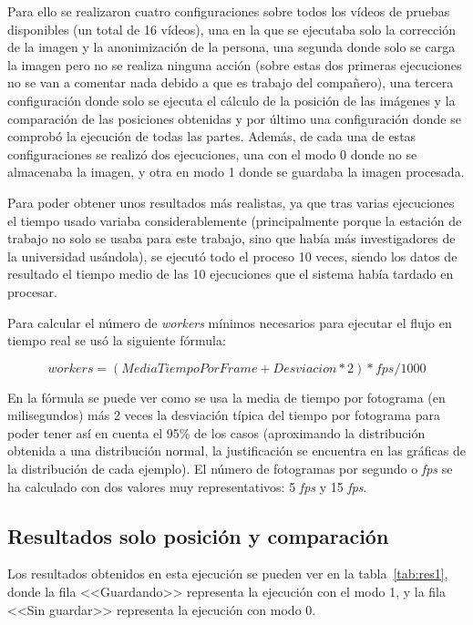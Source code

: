 {Para ello se realizaron cuatro configuraciones sobre todos los vídeos de pruebas disponibles (un total de 16 vídeos), una en la que se ejecutaba solo la corrección de la imagen y la anonimización de la persona, una segunda donde solo se carga la imagen pero no se realiza ninguna acción (sobre estas dos primeras ejecuciones no se van a comentar nada debido a que es trabajo del compañero), una tercera configuración donde solo se ejecuta el cálculo de la posición de las imágenes y la comparación de las posiciones obtenidas y por último una configuración donde se comprobó la ejecución de todas las partes. Además, de cada una de estas configuraciones se realizó dos ejecuciones, una con el modo 0 donde no se almacenaba la imagen, y otra en modo 1 donde se guardaba la imagen procesada.

Para poder obtener unos resultados más realistas, ya que tras varias ejecuciones el tiempo usado variaba considerablemente (principalmente porque la estación de trabajo no solo se usaba para este trabajo, sino que había más investigadores de la universidad usándola), se ejecutó todo el proceso 10 veces, siendo los datos de resultado el tiempo medio de las 10 ejecuciones que el sistema había tardado en procesar.

Para calcular el número de \textit{workers} mínimos necesarios para ejecutar el flujo en tiempo real se usó la siguiente fórmula:

\begin{equation}
workers = (MediaTiempoPorFrame + Desviacion*2)*fps/1000
\end{equation}

En la fórmula se puede ver como se usa la media de tiempo por fotograma (en milisegundos) más 2 veces la desviación típica del tiempo por fotograma para poder tener así en cuenta el 95\% de los casos (aproximando la distribución obtenida a una distribución normal, la justificación se encuentra en las gráficas de la distribución de cada ejemplo). El número de fotogramas por segundo o \textit{fps} se ha calculado con dos valores muy representativos: 5 \textit{fps} y 15 \textit{fps}.

\subsection{Resultados solo posición y comparación}
Los resultados obtenidos en esta ejecución se pueden ver en la tabla~\ref{tab:res1}, donde la fila <<Guardando>> representa la ejecución con el modo 1, y la fila <<Sin guardar>> representa la ejecución con modo 0.

}
